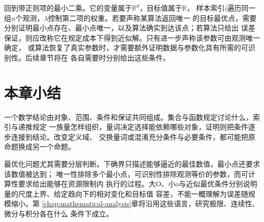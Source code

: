 回到带正则项的最小二乘。它的变量属于$\mathbb{R}^d$，目标值属于$\mathbb{R}$，
样本索引$i$遍历同一组$n$个观测，$\lambda$控制第二项的权重。若要声称某算法返回唯一
的目标最优点，需要分别证明最小点存在、最小点唯一，以及算法确实到达该点；若算法只给出
误差保证，则应改称它在规定成本下得到近似解。只有进一步声称该参数可由观测唯一确定，
或算法恢复了真实参数时，才需要额外证明数据与参数化具有所需的可识别性。后续章节将在
各自需要时分别给出这些条件。

\section{本章小结}
\label{sec:prelim-sets-functions-summary}

一个数学结论由对象、范围、条件和保证共同组成。集合与函数规定讨论什么，索引与递推规定
一族量怎样组织，量词决定选择能依赖哪些对象，证明则把条件逐步连接到结论。改变定义域、
交换量词或混淆充分条件与必要条件，都可能把原命题换成另一个命题。

最优化问题尤其需要分层判断。下确界只描述能够逼近的最佳数值，最小点还要求该数值被达到；
唯一性排除多个最小点，可识别性排除观测等价的参数，而可计算性要求给出能够在资源限制内
执行的过程。大O、小o与近似最优条件分别说明量的尺度上界、给定趋向下的相对变化和目标值
容差，不能一概理解为误差随规模缩小。第
\ref{chap:mathematical-analysis}章将沿用这些语言，研究极限、连续性、微分与积分各在什么
条件下成立。
